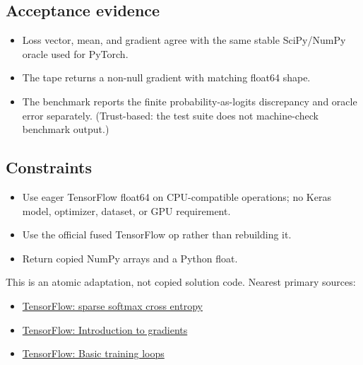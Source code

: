         \subsection{Acceptance evidence}

        \begin{evidencebox}
        \begin{itemize}
          \item Loss vector, mean, and gradient agree with the same stable SciPy/NumPy oracle used for PyTorch.
  \item The tape returns a non-null gradient with matching float64 shape.
  \item The benchmark reports the finite probability-as-logits discrepancy and oracle error separately. (Trust-based: the test suite does not machine-check benchmark output.)
        \end{itemize}
        \end{evidencebox}

        \subsection{Constraints}

        \begin{itemize}
          \item Use eager TensorFlow float64 on CPU-compatible operations; no Keras model, optimizer, dataset, or GPU requirement.
  \item Use the official fused TensorFlow op rather than rebuilding it.
  \item Return copied NumPy arrays and a Python float.
        \end{itemize}

        \begin{sourcebox}
        This is an atomic adaptation, not copied solution code. Nearest primary sources:
        \begin{itemize}
          \item \href{https://www.tensorflow.org/api_docs/python/tf/nn/sparse_softmax_cross_entropy_with_logits}{TensorFlow: sparse softmax cross entropy}
  \item \href{https://www.tensorflow.org/guide/autodiff}{TensorFlow: Introduction to gradients}
  \item \href{https://www.tensorflow.org/guide/basic_training_loops}{TensorFlow: Basic training loops}
        \end{itemize}
        \end{sourcebox}
